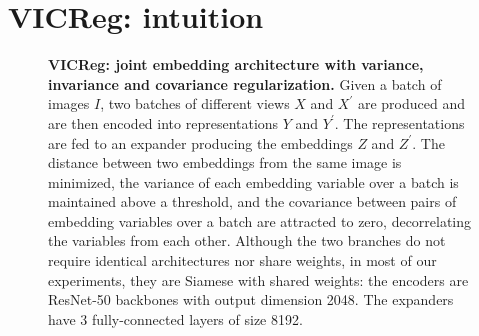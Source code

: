 \documentclass{article}
\newcommand{\algo}{VICReg}
\begin{document}
\section{VICReg: intuition}

\begin{figure}[t]
\centering
\captionsetup[subfigure]{labelformat=empty}
\vspace{-5mm}
\caption{\textbf{\algo: joint embedding architecture with variance, invariance and covariance regularization.} Given a batch of images $I$, two batches of different views $X$ and $X^{\prime}$ are produced and are then encoded into representations $Y$ and $Y^{\prime}$. The representations are fed to an expander producing the embeddings $Z$ and $Z^{\prime}$. The distance between two embeddings from the same image is minimized, the variance of each embedding variable over a batch is maintained above a threshold, and the covariance between pairs of embedding variables over a batch are attracted to zero, decorrelating the variables from each other. 
Although the two branches do not require identical architectures nor share weights, in most of our experiments, they are Siamese with shared weights: the encoders are ResNet-50 backbones with output dimension 2048. The expanders have 3 fully-connected layers of size 8192.}
\label{fig:varcov_archi}
\end{figure}
\end{document}
